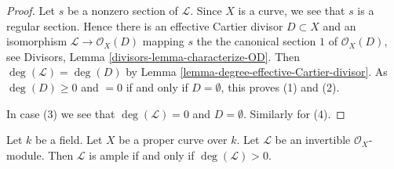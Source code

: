\begin{proof}
Let $s$ be a nonzero section of $\mathcal{L}$. Since $X$ is a curve, we
see that $s$ is a regular section. Hence there is an effective
Cartier divisor $D \subset X$ and an isomorphism
$\mathcal{L} \to \mathcal{O}_X(D)$ mapping $s$ the the canonical
section $1$ of $\mathcal{O}_X(D)$, see
Divisors, Lemma \ref{divisors-lemma-characterize-OD}.
Then $\deg(\mathcal{L}) = \deg(D)$ by
Lemma \ref{lemma-degree-effective-Cartier-divisor}.
As $\deg(D) \geq 0$ and $= 0$
if and only if $D = \emptyset$, this proves (1) and (2).

\medskip\noindent
In case (3) we see that $\deg(\mathcal{L}) = 0$ and
$D = \emptyset$. Similarly for (4).
\end{proof}

\begin{lemma}
\label{lemma-ample-curve}
Let $k$ be a field. Let $X$ be a proper curve over $k$.
Let $\mathcal{L}$ be an invertible $\mathcal{O}_X$-module.
Then $\mathcal{L}$ is ample if and only if $\deg(\mathcal{L}) > 0$.
\end{lemma}

